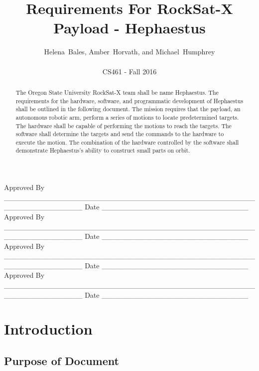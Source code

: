 \documentclass[letterpaper,10pt]{article}
\title{Requirements For RockSat-X Payload - Hephaestus}
\author{Helena~Bales, Amber~Horvath, and Michael~Humphrey\\ \\ CS461 - Fall 2016}
\newenvironment{bottompar}{\par\vspace*{\fill}}{\clearpage}
\begin{document}
\maketitle

\begin{abstract}
The Oregon State University RockSat-X team shall be name Hephaestus.
The requirements for the hardware, software, and programmatic development of Hephaestus shall be outlined in the following document.
The mission requires that the payload, an autonomous robotic arm, perform a series of motions to locate predetermined targets.
The hardware shall be capable of performing the motions to reach the targets.
The software shall determine the targets and send the commands to the hardware to execute the motion.
The combination of the hardware controlled by the software shall demonstrate Hephaestus's ability to construct small parts on orbit.
\end{abstract}

\begin{bottompar}
Approved By
\_\_\_\_\_\_\_\_\_\_\_\_\_\_\_\_\_\_\_\_\_\_\_\_\_\_\_\_\_\_\_\_\_\_\_\_\_\_\_\_\_\_\_\_\_\_\_\_\_\_\_\_\_\_\_\_\_\_\_\_\_\_\_
Date \_\_\_\_\_\_\_\_\_\_\_\_\_\_\_\_\_\_\_\_\_\_\_\_\_\_\_\_ \\


Approved By
\_\_\_\_\_\_\_\_\_\_\_\_\_\_\_\_\_\_\_\_\_\_\_\_\_\_\_\_\_\_\_\_\_\_\_\_\_\_\_\_\_\_\_\_\_\_\_\_\_\_\_\_\_\_\_\_\_\_\_\_\_\_\_
Date \_\_\_\_\_\_\_\_\_\_\_\_\_\_\_\_\_\_\_\_\_\_\_\_\_\_\_\_ \\


Approved By
\_\_\_\_\_\_\_\_\_\_\_\_\_\_\_\_\_\_\_\_\_\_\_\_\_\_\_\_\_\_\_\_\_\_\_\_\_\_\_\_\_\_\_\_\_\_\_\_\_\_\_\_\_\_\_\_\_\_\_\_\_\_\_
Date \_\_\_\_\_\_\_\_\_\_\_\_\_\_\_\_\_\_\_\_\_\_\_\_\_\_\_\_ \\


Approved By
\_\_\_\_\_\_\_\_\_\_\_\_\_\_\_\_\_\_\_\_\_\_\_\_\_\_\_\_\_\_\_\_\_\_\_\_\_\_\_\_\_\_\_\_\_\_\_\_\_\_\_\_\_\_\_\_\_\_\_\_\_\_\_
Date \_\_\_\_\_\_\_\_\_\_\_\_\_\_\_\_\_\_\_\_\_\_\_\_\_\_\_\_ \\
\end{bottompar}

\clearpage
\tableofcontents
\clearpage

\section{Introduction}
\subsection{Purpose of Document}
\end{document}
